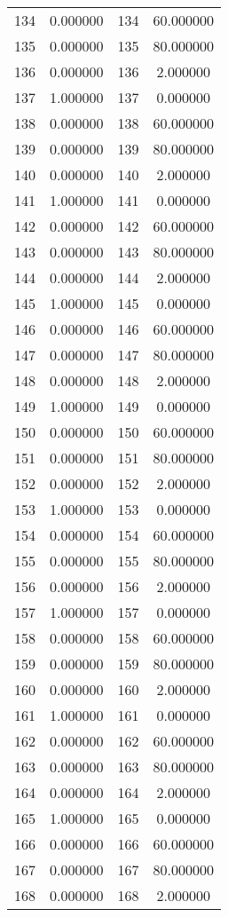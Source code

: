 \documentclass[12pt]{article}
\begin{document}
\begin{longtable}{@{}cccc@{}}
134 & 0.000000 & 134 & 60.000000 \\
135 & 0.000000 & 135 & 80.000000 \\
136 & 0.000000 & 136 & 2.000000 \\
137 & 1.000000 & 137 & 0.000000 \\
138 & 0.000000 & 138 & 60.000000 \\
139 & 0.000000 & 139 & 80.000000 \\
140 & 0.000000 & 140 & 2.000000 \\
141 & 1.000000 & 141 & 0.000000 \\
142 & 0.000000 & 142 & 60.000000 \\
143 & 0.000000 & 143 & 80.000000 \\
144 & 0.000000 & 144 & 2.000000 \\
145 & 1.000000 & 145 & 0.000000 \\
146 & 0.000000 & 146 & 60.000000 \\
147 & 0.000000 & 147 & 80.000000 \\
148 & 0.000000 & 148 & 2.000000 \\
149 & 1.000000 & 149 & 0.000000 \\
150 & 0.000000 & 150 & 60.000000 \\
151 & 0.000000 & 151 & 80.000000 \\
152 & 0.000000 & 152 & 2.000000 \\
153 & 1.000000 & 153 & 0.000000 \\
154 & 0.000000 & 154 & 60.000000 \\
155 & 0.000000 & 155 & 80.000000 \\
156 & 0.000000 & 156 & 2.000000 \\
157 & 1.000000 & 157 & 0.000000 \\
158 & 0.000000 & 158 & 60.000000 \\
159 & 0.000000 & 159 & 80.000000 \\
160 & 0.000000 & 160 & 2.000000 \\
161 & 1.000000 & 161 & 0.000000 \\
162 & 0.000000 & 162 & 60.000000 \\
163 & 0.000000 & 163 & 80.000000 \\
164 & 0.000000 & 164 & 2.000000 \\
165 & 1.000000 & 165 & 0.000000 \\
166 & 0.000000 & 166 & 60.000000 \\
167 & 0.000000 & 167 & 80.000000 \\
168 & 0.000000 & 168 & 2.000000 \\

\end{longtable}
\end{document}
